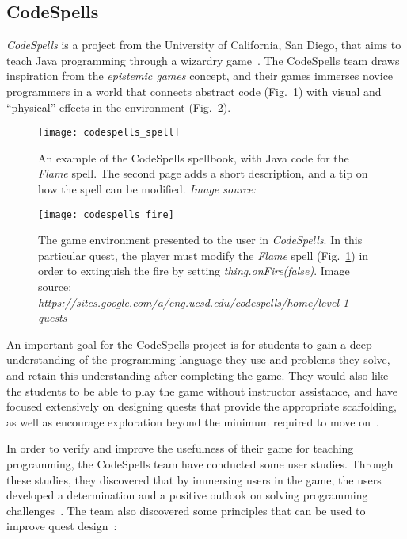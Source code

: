 \subsection{CodeSpells}
\label{sec:codespells}
\emph{CodeSpells} is a project from the University of California, San Diego, that aims to teach Java programming through a wizardry game~\cite{esper:codespells}. The CodeSpells team draws inspiration from the \emph{epistemic games} concept, and their games immerses novice programmers in a world that connects abstract code (Fig.~\ref{fig:codespells_spell}) with visual and ``physical'' effects in the environment (Fig.~\ref{fig:codespells_fire}).

\begin{figure}[htp]
	\centering
	\texttt{[image: codespells\_spell]}
	\caption[Java code for a \emph{CodeSpells} spell]{An example of the CodeSpells spellbook, with Java code for the \emph{Flame} spell. The second page adds a short description, and a tip on how the spell can be modified. \emph{Image source:~\cite{esper:codespells}}}
	\label{fig:codespells_spell}
\end{figure}

\begin{figure}[htp]
	\centering
	\texttt{[image: codespells\_fire]}
	\caption[The \emph{CodeSpells} game environment]{The game environment presented to the user in \emph{CodeSpells}. In this particular quest, the player must modify the \emph{Flame} spell (Fig.~\ref{fig:codespells_spell}) in order to extinguish the fire by setting \emph{thing.onFire(false)}. Image source: \emph{\url{https://sites.google.com/a/eng.ucsd.edu/codespells/home/level-1-quests}}}
	\label{fig:codespells_fire}
\end{figure}

\noindent
An important goal for the CodeSpells project is for students to gain a deep understanding of the programming language they use and problems they solve, and retain this understanding after completing the game. They would also like the students to be able to play the game without instructor assistance, and have focused extensively on designing quests that provide the appropriate scaffolding, as well as encourage exploration beyond the minimum required to move on~\cite{esper:design_quests_java_concepts}.

\noindent
In order to verify and improve the usefulness of their game for teaching programming, the CodeSpells team have conducted some user studies. Through these studies, they discovered that by immersing users in the game, the users developed a determination and a positive outlook on solving programming challenges~\cite{esper:codespells}. The team also discovered some principles that can be used to improve quest design~\cite{esper:design_quests_java_concepts}:

